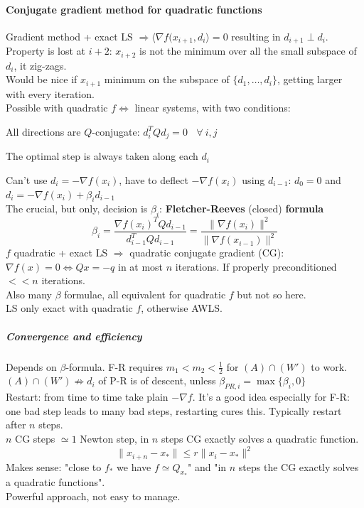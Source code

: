 \documentclass[10pt]{report}
\begin{document}
\paragraph{Conjugate gradient method for quadratic functions} Gradient method + exact LS $\Rightarrow \langle \nabla f(x_{i+1}, d_i\rangle = 0$ resulting in $d_{i+1} \perp d_i$. Property is lost at $i+2$: $x_{i+2}$ is not the minimum over all the small subspace of $d_i$, it zig-zags.\\
Would be nice if $x_{i+1}$ minimum on the subspace of $\{d_1,\ldots,d_i\}$, getting larger with every iteration.\\
Possible with quadratic $f\Leftrightarrow$ linear systems, with two conditions:
\begin{list}{}{}
	\item All directions are $Q$-conjugate: $d_i^TQd_j=0\:\:\:\:\forall\:i,j$
	\item The optimal step is always taken along each $d_i$
\end{list}
Can't use $d_i = -\nabla f(x_i)$, have to deflect $-\nabla f(x_i)$ using $d_{i-1}$: $d_0 = 0$ and $d_i = -\nabla f(x_i) + \beta_id_{i-1}$\\
The crucial, but only, decision is $\beta_i$: \textbf{Fletcher-Reeves} (closed) \textbf{formula}
$$\beta_i = \frac{\nabla f(x_i)^T Qd_{i-1}}{d_{i-1}^TQd_{i-1}} = \frac{\|\nabla f(x_i)\|^2}{\|\nabla f(x_{i-1})\|^2}$$
$f$ quadratic + exact LS $\Rightarrow$ quadratic conjugate gradient (CG): $\nabla f(x) = 0 \Leftrightarrow Qx = -q$ in at most $n$ iterations. If properly preconditioned $<< n$ iterations.\\
Also many $\beta$ formulae, all equivalent for quadratic $f$ but not so here.\\
LS only exact with quadratic $f$, otherwise AWLS.
\subparagraph{Convergence and efficiency} Depends on $\beta$-formula. F-R requires $m_1<m_2<\frac{1}{2}$ for $(A)\cap(W')$ to work.\\
$(A)\cap(W')\not\Rightarrow d_i$ of P-R is of descent, unless $\beta_{PR,i} = \max\{\beta_i, 0\}$\\
Restart: from time to time take plain $-\nabla f$. It's a good idea especially for F-R: one bad step leads to many bad steps, restarting cures this. Typically restart after $n$ steps.\\
$n$ CG steps $\simeq 1$ Newton step, in $n$ steps CG exactly solves a quadratic function.
$$\|x_{i+n}-x_*\|\leq r\|x_i-x_*\|^2$$
Makes sense: "close to $f_*$ we have $f\simeq Q_{x_*}$" and "in $n$ steps the CG exactly solves a quadratic functions".\\
Powerful approach, not easy to manage.
\end{document}
